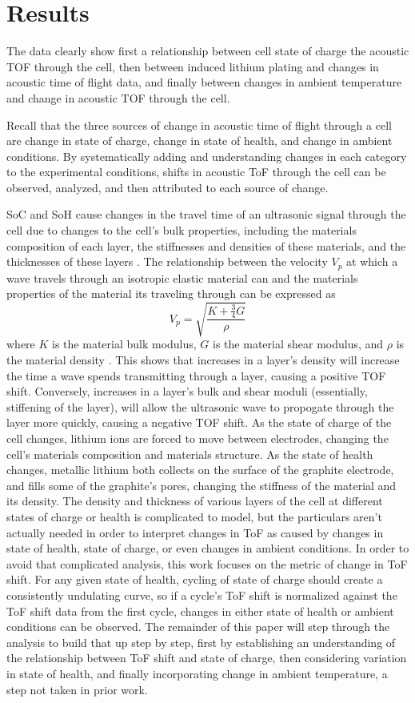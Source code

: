 \chapter{Results}

The data clearly show first a relationship between cell state of charge the acoustic TOF through the cell, then between induced lithium plating and changes in acoustic time of flight data, and finally between changes in ambient temperature and change in acoustic TOF through the cell. 

Recall that the three sources of change in acoustic time of flight through a cell are change in state of charge, change in state of health, and change in ambient conditions. 
By systematically adding and understanding changes in each category to the experimental conditions, shifts in acoustic ToF through the cell can be observed, analyzed, and then attributed to each source of change.

SoC and SoH cause changes in the travel time of an ultrasonic signal through the cell due to changes to the cell's bulk properties, including the materials composition of each layer, the stiffnesses and densities of these materials, and the thicknesses of these layers \cite{SOC-SOH-EST}. The relationship between the velocity $V_p$ at which a wave travels through an isotropic elastic material can and the materials properties of the material its traveling through can be expressed as
$$ V_p = \sqrt{\frac{K + \frac{3}{4}G}{\rho}}$$
where $K$ is the material bulk modulus, $G$ is the material shear modulus, and $\rho$ is the material density \cite{SOC-SOH-EST}. This shows that increases in a layer's density will increase the time a wave spends transmitting through a layer, causing a positive TOF shift. Conversely, increases in a layer's bulk and shear moduli (essentially, stiffening of the layer), will allow the ultrasonic wave to propogate through the layer more quickly, causing a negative TOF shift. As the state of charge of the cell changes, lithium ions are forced to move between electrodes, changing the cell's materials composition and materials structure. As the state of health changes, metallic lithium both collects on the surface of the graphite electrode, and fills some of the graphite's pores, changing the stiffness of the material and its density. The density and thickness of various layers of the cell at different states of charge or health is complicated to model, but the particulars aren't actually needed in order to interpret changes in ToF as caused by changes in state of health, state of charge, or even changes in ambient conditions. In order to avoid that complicated analysis, this work focuses on the metric of change in ToF shift. For any given state of health, cycling of state of charge should create a consistently undulating curve, so if a cycle's ToF shift is normalized against the ToF shift data from the first cycle, changes in either state of health or ambient conditions can be observed. The remainder of this paper will step through the analysis to build that up step by step, first by establishing an understanding of the relationship between ToF shift and state of charge, then considering variation in state of health, and finally incorporating change in ambient temperature, a step not taken in prior work.

